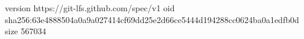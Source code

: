 version https://git-lfs.github.com/spec/v1
oid sha256:63e4888504a0a9a027414cf69dd25e2d66ce5444d194288cc0624ba0a1edfb0d
size 567034
